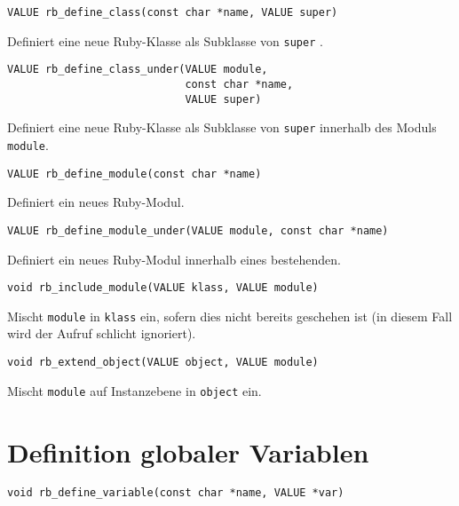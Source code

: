 \begin{lstlisting}
VALUE rb_define_class(const char *name, VALUE super)
\end{lstlisting}

\noindent Definiert eine neue Ruby-Klasse als Subklasse von
\verb+super+ .

\begin{lstlisting}
VALUE rb_define_class_under(VALUE module,
                            const char *name,
                            VALUE super)
\end{lstlisting}

\noindent Definiert eine neue Ruby-Klasse als Subklasse von
\verb+super+ innerhalb des Moduls \verb+module+.

\begin{lstlisting}
VALUE rb_define_module(const char *name)
\end{lstlisting}

\noindent Definiert ein neues Ruby-Modul.

\begin{lstlisting}
VALUE rb_define_module_under(VALUE module, const char *name)
\end{lstlisting}

\noindent Definiert ein neues Ruby-Modul innerhalb eines bestehenden.

\begin{lstlisting}
void rb_include_module(VALUE klass, VALUE module)
\end{lstlisting}

\noindent Mischt \verb+module+ in \verb+klass+ ein, sofern dies nicht
bereits geschehen ist (in diesem Fall wird der Aufruf schlicht
ignoriert). 

\begin{lstlisting}
void rb_extend_object(VALUE object, VALUE module)
\end{lstlisting}

\noindent Mischt \verb+module+ auf Instanzebene in \verb+object+
ein. 

\section{Definition globaler Variablen}
\label{sec:api-globals}

\begin{lstlisting}
void rb_define_variable(const char *name, VALUE *var)
\end{lstlisting}

